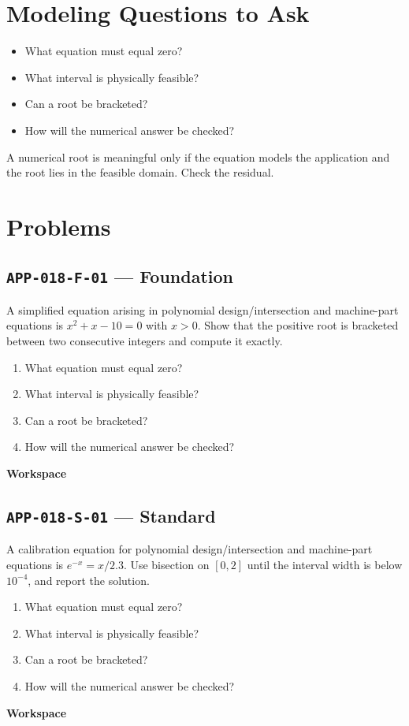 \documentclass[11pt]{book}
\newcommand{\pid}[1]{\texttt{#1}}
\newcommand{\workspace}{\par\vspace{0.7in}\hrulefill\par\vspace{0.55in}\hrulefill\par}
\begin{document}
\section*{Modeling Questions to Ask}\begin{itemize}
\item What equation must equal zero?
\item What interval is physically feasible?
\item Can a root be bracketed?
\item How will the numerical answer be checked?
\end{itemize}
\begin{errorbox}A numerical root is meaningful only if the equation models the application and the root lies in the feasible domain. Check the residual.\end{errorbox}
\section*{Problems}
\subsection*{\pid{APP-018-F-01} — Foundation}
\begin{problembox}
A simplified equation arising in polynomial design/intersection and machine-part equations is $x^2+x-10=0$ with $x>0$. Show that the positive root is bracketed between two consecutive integers and compute it exactly.
\end{problembox}
\begin{promptbox}\begin{enumerate}
\item What equation must equal zero?
\item What interval is physically feasible?
\item Can a root be bracketed?
\item How will the numerical answer be checked?
\end{enumerate}\end{promptbox}
\textbf{Workspace}\workspace
{}
\subsection*{\pid{APP-018-S-01} — Standard}
\begin{problembox}
A calibration equation for polynomial design/intersection and machine-part equations is $e^{-x}=x/2.3$. Use bisection on $[0,2]$ until the interval width is below $10^{-4}$, and report the solution.
\end{problembox}
\begin{promptbox}\begin{enumerate}
\item What equation must equal zero?
\item What interval is physically feasible?
\item Can a root be bracketed?
\item How will the numerical answer be checked?
\end{enumerate}\end{promptbox}
\textbf{Workspace}\workspace
{}
\end{document}
